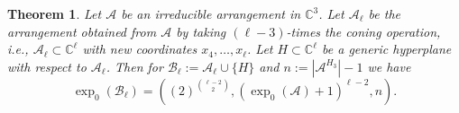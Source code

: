 \documentclass[a4paper,11pt]{amsart}
\def\CC{{\mathbb{C}}}%
\def\C{{\mathbb{C}}}%
\def\A{{\mathcal{A}}}%
\def\B{{\mathcal{B}}}%
\def\C{{\mathcal{C}}}%
\numberwithin{equation}{section}
\newtheorem{theorem}{Theorem}[section]
\theoremstyle{remark}
\begin{document}
\begin{theorem}\label{thm:main_general}
	Let $\A$ be an irreducible arrangement in $\CC^3$. Let $\A_\ell$ be the arrangement obtained from $\A$ by taking $(\ell-3)$-times the coning operation, i.e., $\A_\ell \subset \CC^\ell$ with new coordinates $x_4,\ldots,x_\ell$.
	Let $H\subset \CC^\ell$ be a generic hyperplane with respect to $\A_\ell$.
	Then for $\B_\ell:=\A_\ell \cup \{H\}$ and $n:=|\A^{H_3}|-1$ we have
	$$
	\exp_0(\B_\ell)=((2)^{\binom{\ell-2}{2}},(\exp_0(\A)+ 1)^{\ell-2},n).
	$$

	\label{mainhigh}
\end{theorem}
\end{document}
